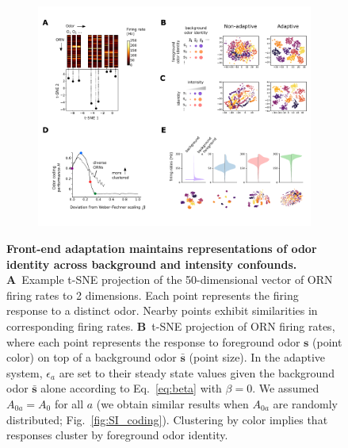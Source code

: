 \documentclass[10pt,prl,aps,showpacs,twocolumn,unsortedaddress,showkeys,linenumbers]{revtex4-1}
\begin{document}
\begin{figure}[!htb]
	\centering
	\begin{subfigure}[t]{\linewidth}
		\includegraphics[width=\textwidth]{figures/2_coding_representation}
		\label{fig:coding_a}
	\end{subfigure}
	\begin{subfigure}[t]{0\linewidth}
		\label{fig:coding_b}
	\end{subfigure}
	\begin{subfigure}[t]{0\linewidth}
		\label{fig:coding_c}
	\end{subfigure}
	\begin{subfigure}[t]{0\linewidth}
		\label{fig:coding_d}
	\end{subfigure}
	\begin{subfigure}[t]{0\linewidth}
		\label{fig:coding_e}
	\end{subfigure}
	\caption{\footnotesize{\textbf{Front-end adaptation maintains representations of odor identity across background and intensity confounds.}
	\textbf{A}~Example t-SNE projection of the 50-dimensional vector of ORN firing rates to 2 dimensions. Each point represents the firing response to a distinct odor. Nearby points exhibit similarities in corresponding firing rates.
	\textbf{B}~t-SNE projection of ORN firing rates, where each point represents the response to foreground odor $\mathbf{s}$ (point color) on top of a background odor $\bar{\mathbf{s}}$ (point size). In the adaptive system, $\epsilon_a$ are set to their steady state values given the background odor $\bar{\mathbf{s}}$ alone according to Eq.~\ref{eq:beta} with $\beta=0$. We assumed $A_{0a}=A_0$ for all $a$ (we obtain similar results when $A_{0a}$ are randomly distributed; Fig.~\ref{fig:SI_coding}). Clustering by color implies that responses cluster by foreground odor identity.
}}
\end{figure}
\end{document}
